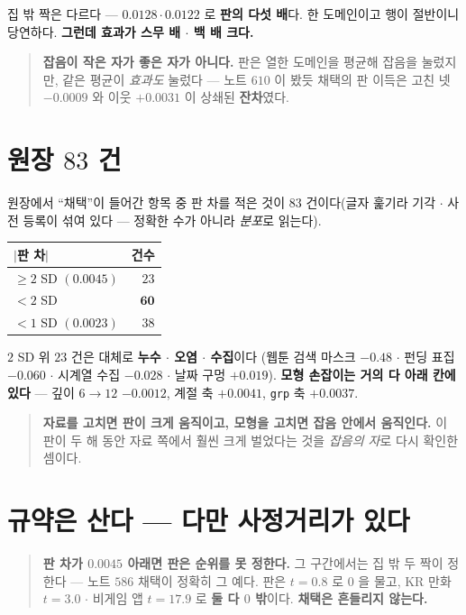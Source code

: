 \documentclass[11pt]{article}
\begin{document}
집 밖 짝은 다르다 --- $0.0128 \cdot 0.0122$ 로 \textbf{판의 다섯 배}다.
한 도메인이고 행이 절반이니 당연하다. \textbf{그런데 효과가 스무 배
$\cdot$ 백 배 크다.}

\begin{quote}
\textbf{잡음이 작은 자가 좋은 자가 아니다.} 판은 열한 도메인을 평균해
잡음을 눌렀지만, 같은 평균이 \emph{효과도} 눌렀다 --- 노트 $610$ 이 봤듯
채택의 판 이득은 고친 넷 $-0.0009$ 와 이웃 $+0.0031$ 이 상쇄된
\textbf{잔차}였다.
\end{quote}

\section{원장 $83$ 건}

원장에서 ``채택''이 들어간 항목 중 판 차를 적은 것이 $83$ 건이다(글자
훑기라 기각 $\cdot$ 사전 등록이 섞여 있다 --- 정확한 수가 아니라
\emph{분포}로 읽는다).

\begin{center}
\begin{tabular}{lr}
\hline
$|$판 차$|$ & 건수 \\
\hline
$\ge 2$ SD $(0.0045)$ & $23$ \\
$< 2$ SD & $\mathbf{60}$ \\
$< 1$ SD $(0.0023)$ & $38$ \\
\hline
\end{tabular}
\end{center}

$2$ SD 위 $23$ 건은 대체로 \textbf{누수 $\cdot$ 오염 $\cdot$ 수집}이다
(웹툰 검색 마스크 $-0.48$ $\cdot$ 펀딩 표집 $-0.060$ $\cdot$ 시계열 수집
$-0.028$ $\cdot$ 날짜 구멍 $+0.019$). \textbf{모형 손잡이는 거의 다 아래
칸에 있다} --- 깊이 $6{\to}12$ $-0.0012$, 계절 축 $+0.0041$, \texttt{grp}
축 $+0.0037$.

\begin{quote}
\textbf{자료를 고치면 판이 크게 움직이고, 모형을 고치면 잡음 안에서
움직인다.} 이 판이 두 해 동안 자료 쪽에서 훨씬 크게 벌었다는 것을
\emph{잡음의 자}로 다시 확인한 셈이다.
\end{quote}

\section{규약은 산다 --- 다만 사정거리가 있다}

\begin{quote}
\textbf{판 차가 $0.0045$ 아래면 판은 순위를 못 정한다.} 그 구간에서는
집 밖 두 짝이 정한다 --- 노트 $586$ 채택이 정확히 그 예다. 판은
$t{=}0.8$ 로 $0$ 을 물고, KR 만화 $t{=}3.0$ $\cdot$ 비게임 앱
$t{=}17.9$ 로 \textbf{둘 다 $0$ 밖}이다. \textbf{채택은 흔들리지 않는다.}
\end{quote}
\end{document}
